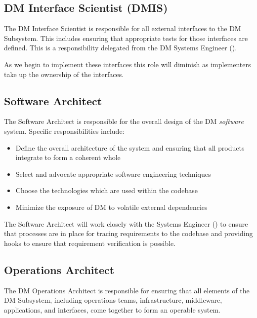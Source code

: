 \subsection{DM Interface Scientist (DMIS) \label{role:dmis}}

The DM Interface Scientist is responsible for all external interfaces to the DM Subsystem. This includes ensuring that appropriate tests for those interfaces are defined. This is a responsibility delegated from the DM Systems Engineer ().

As we begin to implement these interfaces this role will diminish as implementers take up the ownership of the interfaces.

\subsection{Software Architect \label{role:softarc}}

The Software Architect is responsible for the overall design of the DM \textit{software} system. Specific responsibilities include:

\begin{itemize}

\item{Define the overall architecture of the system and ensuring that all products integrate to form a coherent whole}
\item{Select and advocate appropriate software engineering techniques}
\item{Choose the technologies which are used within the codebase}
\item{Minimize the exposure of DM to volatile external dependencies}

\end{itemize}

The Software Architect will work closely with the Systems Engineer () to ensure that processes are in place for tracing requirements to the codebase and providing hooks to ensure that requirement verification is possible.

\subsection{Operations Architect \label{role:opsarc}}

The DM Operations Architect is responsible for ensuring that all elements of the DM Subsystem, including operations teams, infrastructure, middleware, applications, and interfaces,
come together to form an operable system.

